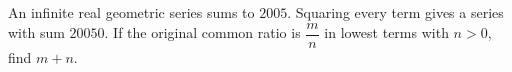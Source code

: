 An infinite real geometric series sums to $2005$. Squaring every term gives a series with sum $20050$. If the original common ratio is $\dfrac{m}{n}$ in lowest terms with $n>0$, find $m+n$.

